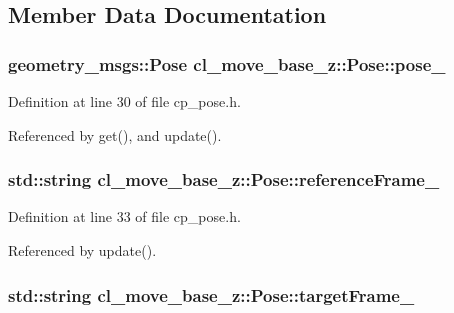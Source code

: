 \subsection{Member Data Documentation}
\subsubsection[{\texorpdfstring{pose\+\_\+}{pose_}}]{\setlength{\rightskip}{0pt plus 5cm}geometry\+\_\+msgs\+::\+Pose cl\+\_\+move\+\_\+base\+\_\+z\+::\+Pose\+::pose\+\_\+\hspace{0.3cm}{\ttfamily [private]}}\hypertarget{classcl__move__base__z_1_1Pose_a07159b1632042a0292ffcc39995da81e}{}\label{classcl__move__base__z_1_1Pose_a07159b1632042a0292ffcc39995da81e}


Definition at line 30 of file cp\+\_\+pose.\+h.



Referenced by get(), and update().

\subsubsection[{\texorpdfstring{reference\+Frame\+\_\+}{referenceFrame_}}]{\setlength{\rightskip}{0pt plus 5cm}std\+::string cl\+\_\+move\+\_\+base\+\_\+z\+::\+Pose\+::reference\+Frame\+\_\+\hspace{0.3cm}{\ttfamily [private]}}\hypertarget{classcl__move__base__z_1_1Pose_a6a7a593232b6edaf99103d48ad8da9d3}{}\label{classcl__move__base__z_1_1Pose_a6a7a593232b6edaf99103d48ad8da9d3}


Definition at line 33 of file cp\+\_\+pose.\+h.



Referenced by update().

\subsubsection[{\texorpdfstring{target\+Frame\+\_\+}{targetFrame_}}]{\setlength{\rightskip}{0pt plus 5cm}std\+::string cl\+\_\+move\+\_\+base\+\_\+z\+::\+Pose\+::target\+Frame\+\_\+\hspace{0.3cm}{\ttfamily [private]}}\hypertarget{classcl__move__base__z_1_1Pose_a01d338f9dbadc597aaea84853d333690}{}\label{classcl__move__base__z_1_1Pose_a01d338f9dbadc597aaea84853d333690}


